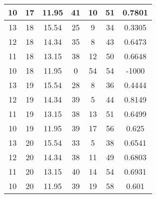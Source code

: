 \documentclass[letterpaper, 12pt]{article}
\begin{document}
\begin{longtable}{|c|c|c|c|c|c|c|}
10 & 17 & 11.95 & 41 & 10 & 51 & 0.7801 \\
\hline
13 & 18 & 15.54 & 25 & 9 & 34 & 0.3305 \\
\hline
12 & 18 & 14.34 & 35 & 8 & 43 & 0.6473 \\
\hline
11 & 18 & 13.15 & 38 & 12 & 50 & 0.6648 \\
\hline
10 & 18 & 11.95 & 0 & 54 & 54 & -1000 \\
\hline
13 & 19 & 15.54 & 28 & 8 & 36 & 0.4444 \\
\hline
12 & 19 & 14.34 & 39 & 5 & 44 & 0.8149 \\
\hline
11 & 19 & 13.15 & 38 & 13 & 51 & 0.6499 \\
\hline
10 & 19 & 11.95 & 39 & 17 & 56 & 0.625 \\
\hline
13 & 20 & 15.54 & 33 & 5 & 38 & 0.6541 \\
\hline
12 & 20 & 14.34 & 38 & 11 & 49 & 0.6803 \\
\hline
11 & 20 & 13.15 & 40 & 14 & 54 & 0.6931 \\
\hline
10 & 20 & 11.95 & 39 & 19 & 58 & 0.601 \\
\hline
\end{longtable}
\end{document}
